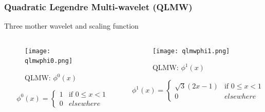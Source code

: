 \begin{frame}\frametitle{Quadratic Legendre Multi-wavelet (QLMW)}
Three mother wavelet and scaling function

    \begin{columns}[T]
      \begin{column}{.5\textwidth}
      
              \begin{figure}
              \centering
              \texttt{[image: qlmwphi0.png]}
              \caption{QLMW: $\phi^0(x)$}
              \label{fig_e_vs_n_f1}
              \end{figure}
              \vspace{-4 mm}

              \tiny{
                \begin{equation}\label{eq:qlmwphi0}
                \phi^0(x)=
                \left\{
                    \begin{array}{ll}
                        1  & \mbox{if } 0 \leq x < 1 \\
                        0 & elsewhere
                    \end{array}
                \right.
              \nonumber
              \end{equation}}


      \end{column}
      \begin{column}{.5\textwidth}

              \begin{figure}
              \centering
              \texttt{[image: qlmwphi1.png]}
              \caption{QLMW: $\phi^1(x)$}
              \label{fig_e_vs_n_f2}
              \end{figure}
              \vspace{-4 mm}

              \tiny{
                 \begin{equation}\label{eq:qlmwphi1}
                  \phi^1(x)=
                  \left\{
                      \begin{array}{ll}
                          \sqrt{3}(2x-1)  & \mbox{if } 0 \leq x < 1 \\
                          0 & elsewhere
                      \end{array}
                  \right.
              \nonumber
              \end{equation}}
        \end{column}
      \end{columns}
\end{frame}


